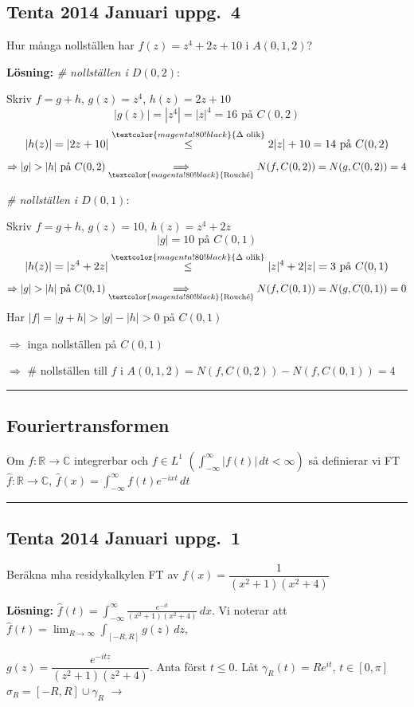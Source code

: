 \subsection{Tenta 2014 Januari uppg.\ 4}
Hur många nollställen har $f(z) = z^4 + 2z + 10$ i $A(0, 1, 2)$?

\textbf{Lösning:}
\emph{\# nollställen i $D(0, 2)$}:

Skriv $f = g + h$, $g(z) = z^4$, $h(z) = 2z + 10$
\[ |g(z)| = |z^4| = |z|^4 = 16 \text{ på } C(0, 2) \]
\[ |h(z)| = |2z + 10| \overset{\textcolor{magenta!80!black}{\Delta \text{ olik}}}{\le} 2|z| + 10 = 14 \text{ på } C(0, 2) \]
\[ \Rightarrow |g| > |h| \text{ på } C(0, 2) \underset{\textcolor{magenta!80!black}{\text{Rouché}}}{\Longrightarrow} N(f, C(0, 2)) = N(g, C(0, 2)) = 4 \]

\emph{\# nollställen i $D(0, 1)$}:

Skriv $f = g + h$, $g(z) = 10$, $h(z) = z^4 + 2z$
\[ |g| = 10 \text{ på } C(0, 1) \]
\[ |h(z)| = |z^4 + 2z| \overset{\textcolor{magenta!80!black}{\Delta \text{ olik}}}{\le} |z|^4 + 2|z| = 3 \text{ på } C(0, 1) \]
\[ \Rightarrow |g| > |h| \text{ på } C(0, 1) \underset{\textcolor{magenta!80!black}{\text{Rouché}}}{\Longrightarrow} N(f, C(0, 1)) = N(g, C(0, 1)) = 0 \]
Har $|f| = |g + h| > |g| - |h| > 0$ på $C(0, 1)$

$\Rightarrow$ inga nollställen på $C(0, 1)$

$\Rightarrow$ \# nollställen till $f$ i $A(0, 1, 2) = N(f, C(0, 2)) - N(f, C(0, 1)) = 4$

\noindent\rule{\linewidth}{0.4pt}

\subsection{Fouriertransformen}
\begin{definition}
Om $f : \mathbb{R} \to \mathbb{C}$ integrerbar och $f \in L^1$ $\left( \int_{-\infty}^\infty |f(t)|\,dt < \infty \right)$ så definierar vi FT $\hat{f} : \mathbb{R} \to \mathbb{C}$, $\hat{f}(x) = \displaystyle\int_{-\infty}^\infty f(t)e^{-ixt}\,dt$
\end{definition}

\noindent\rule{\linewidth}{0.4pt}

\subsection{Tenta 2014 Januari uppg.\ 1}
Beräkna mha residykalkylen FT av $f(x) = \dfrac{1}{(x^2 + 1)(x^2 + 4)}$

\textbf{Lösning:} $\hat{f}(t) = \displaystyle\int_{-\infty}^\infty \frac{e^{-it}}{(x^2 + 1)(x^2 + 4)}\,dx$. Vi noterar att $\hat{f}(t) = \displaystyle\lim_{R \to \infty} \int_{[-R, R]} g(z)\,dz$,

$g(z) = \dfrac{e^{-itz}}{(z^2 + 1)(z^2 + 4)}$. Anta först $t \le 0$. Låt $\gamma_R(t) = Re^{it}$, $t \in [0, \pi]$
$\sigma_R = [-R, R] \cup \gamma_R$ \hfill $\longrightarrow$

